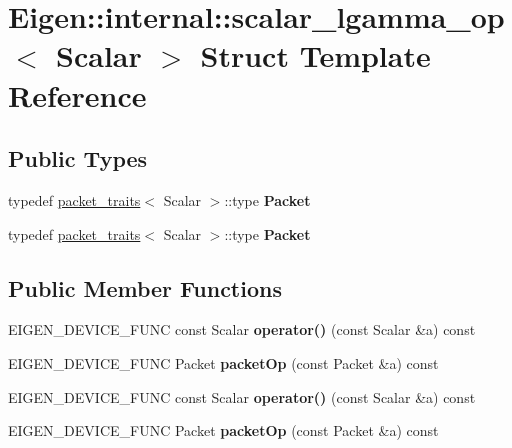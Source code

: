 \hypertarget{struct_eigen_1_1internal_1_1scalar__lgamma__op}{}\section{Eigen\+:\+:internal\+:\+:scalar\+\_\+lgamma\+\_\+op$<$ Scalar $>$ Struct Template Reference}
\label{struct_eigen_1_1internal_1_1scalar__lgamma__op}
\subsection*{Public Types}
\begin{DoxyCompactItemize}
\item 
\mbox{\label{struct_eigen_1_1internal_1_1scalar__lgamma__op_af2b47ca96c3e1bba11b2d7c6eac6d62c}} 
typedef \hyperlink{struct_eigen_1_1internal_1_1packet__traits}{packet\+\_\+traits}$<$ Scalar $>$\+::type {\bfseries Packet}
\item 
\mbox{\label{struct_eigen_1_1internal_1_1scalar__lgamma__op_af2b47ca96c3e1bba11b2d7c6eac6d62c}} 
typedef \hyperlink{struct_eigen_1_1internal_1_1packet__traits}{packet\+\_\+traits}$<$ Scalar $>$\+::type {\bfseries Packet}
\end{DoxyCompactItemize}
\subsection*{Public Member Functions}
\begin{DoxyCompactItemize}
\item 
\mbox{\label{struct_eigen_1_1internal_1_1scalar__lgamma__op_a2a6349c1f1cba6c7bb47ee597d54e922}} 
E\+I\+G\+E\+N\+\_\+\+D\+E\+V\+I\+C\+E\+\_\+\+F\+U\+NC const Scalar {\bfseries operator()} (const Scalar \&a) const
\item 
\mbox{\label{struct_eigen_1_1internal_1_1scalar__lgamma__op_af8d58cbd387f04a1f8f902878b64ff9e}} 
E\+I\+G\+E\+N\+\_\+\+D\+E\+V\+I\+C\+E\+\_\+\+F\+U\+NC Packet {\bfseries packet\+Op} (const Packet \&a) const
\item 
\mbox{\label{struct_eigen_1_1internal_1_1scalar__lgamma__op_a2a6349c1f1cba6c7bb47ee597d54e922}} 
E\+I\+G\+E\+N\+\_\+\+D\+E\+V\+I\+C\+E\+\_\+\+F\+U\+NC const Scalar {\bfseries operator()} (const Scalar \&a) const
\item 
\mbox{\label{struct_eigen_1_1internal_1_1scalar__lgamma__op_af8d58cbd387f04a1f8f902878b64ff9e}} 
E\+I\+G\+E\+N\+\_\+\+D\+E\+V\+I\+C\+E\+\_\+\+F\+U\+NC Packet {\bfseries packet\+Op} (const Packet \&a) const
\end{DoxyCompactItemize}


